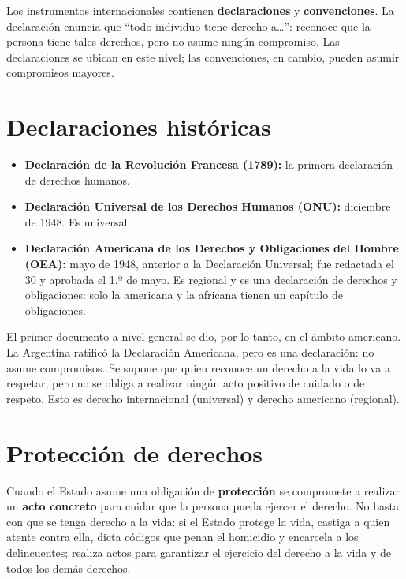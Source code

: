 \documentclass[12pt,oneside]{book}
\begin{document}
Los instrumentos internacionales contienen \textbf{declaraciones} y \textbf{convenciones}. La declaración enuncia que ``todo individuo tiene derecho a\dots'': reconoce que la persona tiene tales derechos, pero no asume ningún compromiso. Las declaraciones se ubican en este nivel; las convenciones, en cambio, pueden asumir compromisos mayores.

\section{Declaraciones históricas}

\begin{itemize}
    \item \textbf{Declaración de la Revolución Francesa (1789):} la primera declaración de derechos humanos.
    \item \textbf{Declaración Universal de los Derechos Humanos (ONU):} diciembre de 1948. Es universal.
    \item \textbf{Declaración Americana de los Derechos y Obligaciones del Hombre (OEA):} mayo de 1948, anterior a la Declaración Universal; fue redactada el 30 y aprobada el 1.º de mayo. Es regional y es una declaración de derechos y obligaciones: solo la americana y la africana tienen un capítulo de obligaciones.
\end{itemize}

El primer documento a nivel general se dio, por lo tanto, en el ámbito americano. La Argentina ratificó la Declaración Americana, pero es una declaración: no asume compromisos. Se supone que quien reconoce un derecho a la vida lo va a respetar, pero no se obliga a realizar ningún acto positivo de cuidado o de respeto. Esto es derecho internacional (universal) y derecho americano (regional).

\section{Protección de derechos}

Cuando el Estado asume una obligación de \textbf{protección} se compromete a realizar un \textbf{acto concreto} para cuidar que la persona pueda ejercer el derecho. No basta con que se tenga derecho a la vida: si el Estado protege la vida, castiga a quien atente contra ella, dicta códigos que penan el homicidio y encarcela a los delincuentes; realiza actos para garantizar el ejercicio del derecho a la vida y de todos los demás derechos.
\end{document}
